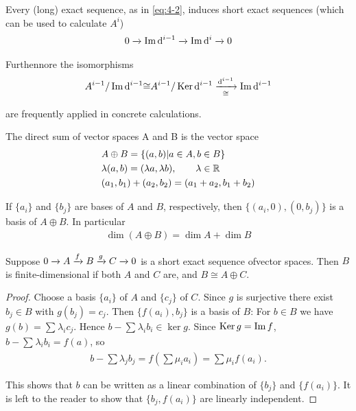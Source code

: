 Every (long) exact sequence, as in \eqref{eq:4-2}, induces short exact sequences (which can
be used to calculate $A^i$)
\begin{align*}
  0\xrightarrow[]{} \operatorname{Im}\mathrm{d}^{i-1} \xrightarrow[]{} \operatorname{Im}\mathrm{d}^i \xrightarrow[]{} 0
\end{align*}

Furthennore the isomorphisms
\begin{align*}
  A^{i-1}/\operatorname{Im}\mathrm{d}^{i-1} {\cong} A^{i-1}/\operatorname{Ker}\mathrm{d}^{i-1} \xrightarrow[\cong]{\mathrm{d}^{i-1}} \operatorname{Im}\mathrm{d}^{i-1}
\end{align*}

are frequently applied in concrete calculations.

The direct sum of vector spaces A and B is the vector space
\begin{align*}
   & A\oplus B  = \{(a,b) | a\in A, b\in B\}                       \\
   & \lambda(a, b)  = (\lambda a, \lambda b), \qquad \lambda\in\mathbb{R} \\
   & (a_1, b_1) + (a_2, b_2)  = (a_1 + a_2, b_1 + b_2)
\end{align*}

If $\{a_i\}$ and $\{b_j\}$ are bases of $A$ and $B$, respectively, then $\{(a_i, 0), (0, b_j)\}$ is a
basis of $A\oplus B$. In particular
\begin{align*}
  \dim(A\oplus B) = \dim A + \dim B
\end{align*}

\begin{lemma}\label{lemma:4-1}
  Suppose $0\xrightarrow[]{}A\xrightarrow[]{f}B\xrightarrow[]{g}C\xrightarrow[]{}0$ is a short exact sequence ofvector
  spaces. Then $B$ is finite-dimensional if both $A$ and $C$ are, and $B\cong A\oplus C$.
\end{lemma}

\begin{proof}
  Choose a basis $\{a_i\}$ of $A$ and $\{c_j\}$ of $C$. Since $g$ is surjective there
  exist $b_j\in B$ with $g(b_j) = c_j$. Then $\{f(a_i), b_j\}$ is a basis of $B$: For $b\in B$
  we have $g(b) = \sum_{}^{}{\lambda_ic_j}$. Hence $b - \sum_{}^{}{\lambda_ib_i}\in\ker g$. Since
  $\operatorname{Ker} g= \operatorname{Im} f$, $b - \sum_{}^{}{\lambda_ib_i} = f(a)$, so
  \begin{align*}
    b-\sum\lambda_jb_j=f\left(\sum\mu_ia_i\right)=\sum\mu_if(a_i).
  \end{align*}

  This shows that $b$ can be written as a linear combination of $\{b_j\}$ and $\{f(a_i)\}$. It
  is left to the reader to show that $\{b_j, f(a_i)\}$ are linearly independent.
\end{proof}

